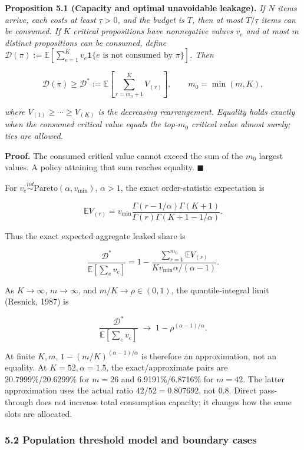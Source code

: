 \documentclass[
  11pt]{article}
\begin{document}
\textbf{Proposition 5.1 (Capacity and optimal unavoidable leakage).}
\emph{If \(N\) items arrive, each costs at least \(\underline\tau>0\),
and the budget is \(T\), then at most \(T/\underline\tau\) items can be
consumed. If \(K\) critical propositions have nonnegative values \(v_e\)
and at most \(m\) distinct propositions can be consumed, define
\(\mathcal D(\pi):=\mathbb E[\sum_{e=1}^Kv_e\mathbf 1\{e\text{ is not consumed by }\pi\}]\).
Then}

\[\mathcal D(\pi)\ge\mathcal D^*:=\mathbb E\!\left[\sum_{r=m_0+1}^{K}V_{(r)}\right],\qquad m_0=\min(m,K),\]

\emph{where \(V_{(1)}\ge\cdots\ge V_{(K)}\) is the decreasing
rearrangement. Equality holds exactly when the consumed critical value
equals the top-\(m_0\) critical value almost surely; ties are allowed.}

\textbf{Proof.} The consumed critical value cannot exceed the sum of the
\(m_0\) largest values. A policy attaining that sum reaches equality.
\(\blacksquare\)

For \(v_e\overset{iid}{\sim}\mathrm{Pareto}(\alpha,v_{\min})\),
\(\alpha>1\), the exact order-statistic expectation is

\[\mathbb E V_{(r)}=v_{\min}\frac{\Gamma(r-1/\alpha)\Gamma(K+1)}{\Gamma(r)\Gamma(K+1-1/\alpha)}.\]

Thus the exact expected aggregate leaked share is

\[\frac{\mathcal D^*}{\mathbb E[\sum_e v_e]}=1-\frac{\sum_{r=1}^{m_0}\mathbb E V_{(r)}}{Kv_{\min}\alpha/(\alpha-1)}.\]

As \(K\to\infty\), \(m\to\infty\), and \(m/K\to\rho\in(0,1)\), the
quantile-integral limit (Resnick, 1987) is

\[\frac{\mathcal D^*}{\mathbb E[\sum_e v_e]}\;\longrightarrow\;1-\rho^{(\alpha-1)/\alpha}.\]

At finite \(K,m\), \(1-(m/K)^{(\alpha-1)/\alpha}\) is therefore an
approximation, not an equality. At \(K=52,\alpha=1.5\), the
exact/approximate pairs are 20.7999\%/20.6299\% for \(m=26\) and
6.9191\%/6.8716\% for \(m=42\). The latter approximation uses the actual
ratio \(42/52=0.807692\), not 0.8. Direct pass-through does not increase
total consumption capacity; it changes how the same slots are allocated.

\subsubsection{5.2 Population threshold model and boundary
cases}\label{population-threshold-model-and-boundary-cases}
\end{document}
